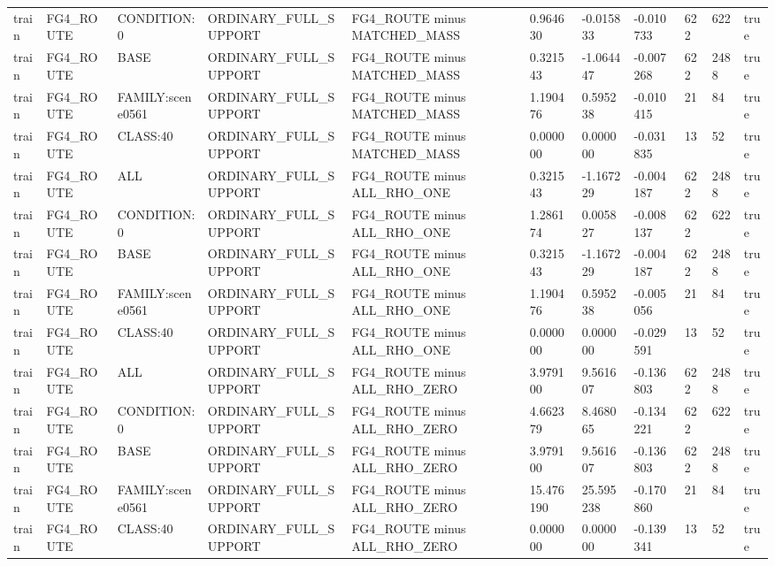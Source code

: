 \begin{tabular}{lllllllllll}
train & FG4\_ROUTE & CONDITION:0 & ORDINARY\_FULL\_SUPPORT & FG4\_ROUTE minus MATCHED\_MASS & 0.964630 & -0.015833 & -0.010733 & 622 & 622 & true \\
train & FG4\_ROUTE & BASE & ORDINARY\_FULL\_SUPPORT & FG4\_ROUTE minus MATCHED\_MASS & 0.321543 & -1.064447 & -0.007268 & 622 & 2488 & true \\
train & FG4\_ROUTE & FAMILY:scene0561 & ORDINARY\_FULL\_SUPPORT & FG4\_ROUTE minus MATCHED\_MASS & 1.190476 & 0.595238 & -0.010415 & 21 & 84 & true \\
train & FG4\_ROUTE & CLASS:40 & ORDINARY\_FULL\_SUPPORT & FG4\_ROUTE minus MATCHED\_MASS & 0.000000 & 0.000000 & -0.031835 & 13 & 52 & true \\
train & FG4\_ROUTE & ALL & ORDINARY\_FULL\_SUPPORT & FG4\_ROUTE minus ALL\_RHO\_ONE & 0.321543 & -1.167229 & -0.004187 & 622 & 2488 & true \\
train & FG4\_ROUTE & CONDITION:0 & ORDINARY\_FULL\_SUPPORT & FG4\_ROUTE minus ALL\_RHO\_ONE & 1.286174 & 0.005827 & -0.008137 & 622 & 622 & true \\
train & FG4\_ROUTE & BASE & ORDINARY\_FULL\_SUPPORT & FG4\_ROUTE minus ALL\_RHO\_ONE & 0.321543 & -1.167229 & -0.004187 & 622 & 2488 & true \\
train & FG4\_ROUTE & FAMILY:scene0561 & ORDINARY\_FULL\_SUPPORT & FG4\_ROUTE minus ALL\_RHO\_ONE & 1.190476 & 0.595238 & -0.005056 & 21 & 84 & true \\
train & FG4\_ROUTE & CLASS:40 & ORDINARY\_FULL\_SUPPORT & FG4\_ROUTE minus ALL\_RHO\_ONE & 0.000000 & 0.000000 & -0.029591 & 13 & 52 & true \\
train & FG4\_ROUTE & ALL & ORDINARY\_FULL\_SUPPORT & FG4\_ROUTE minus ALL\_RHO\_ZERO & 3.979100 & 9.561607 & -0.136803 & 622 & 2488 & true \\
train & FG4\_ROUTE & CONDITION:0 & ORDINARY\_FULL\_SUPPORT & FG4\_ROUTE minus ALL\_RHO\_ZERO & 4.662379 & 8.468065 & -0.134221 & 622 & 622 & true \\
train & FG4\_ROUTE & BASE & ORDINARY\_FULL\_SUPPORT & FG4\_ROUTE minus ALL\_RHO\_ZERO & 3.979100 & 9.561607 & -0.136803 & 622 & 2488 & true \\
train & FG4\_ROUTE & FAMILY:scene0561 & ORDINARY\_FULL\_SUPPORT & FG4\_ROUTE minus ALL\_RHO\_ZERO & 15.476190 & 25.595238 & -0.170860 & 21 & 84 & true \\
train & FG4\_ROUTE & CLASS:40 & ORDINARY\_FULL\_SUPPORT & FG4\_ROUTE minus ALL\_RHO\_ZERO & 0.000000 & 0.000000 & -0.139341 & 13 & 52 & true \\

\end{tabular}
